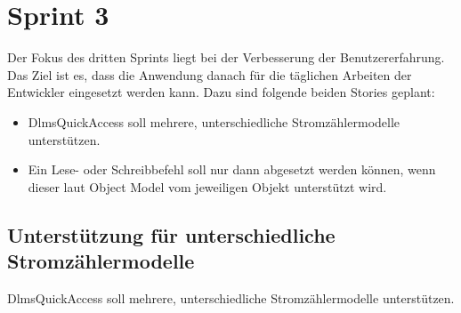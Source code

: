 \section{Sprint 3}
Der Fokus des dritten Sprints liegt bei der Verbesserung der Benutzererfahrung.
Das Ziel ist es, dass die Anwendung danach für die täglichen Arbeiten der Entwickler eingesetzt werden kann.
Dazu sind folgende beiden Stories geplant:
\begin{itemize}
   \item DlmsQuickAccess soll mehrere, unterschiedliche Stromzählermodelle unterstützen.
   \item Ein Lese- oder Schreibbefehl soll nur dann abgesetzt werden können, wenn dieser laut Object Model vom jeweiligen Objekt unterstützt wird.
\end{itemize}




\subsection{Unterstützung für unterschiedliche Stromzählermodelle}
\dq  DlmsQuickAccess soll mehrere, unterschiedliche Stromzählermodelle unterstützen.\dq
